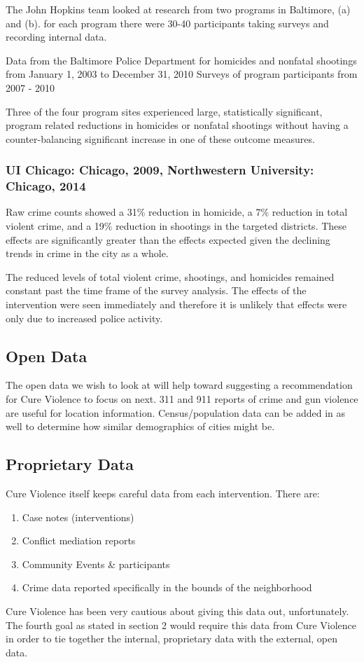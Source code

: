 \documentclass[11pt,preprint]{aastex}
\begin{document}
The John Hopkins team looked at research from two programs in Baltimore, (a) and (b). for each program there were 30-40 participants taking surveys and recording internal data. 

Data from the Baltimore Police Department for homicides and nonfatal shootings from January 1, 2003 to December 31, 2010
Surveys of program participants from 2007 - 2010


Three of the four program sites experienced large, statistically significant, program related reductions in homicides or nonfatal shootings without having a counter-balancing significant increase in one of these outcome measures.


\subsubsection*{UI Chicago: Chicago, 2009, Northwestern University: Chicago, 2014}

Raw crime counts showed a 31\% reduction in homicide, a 7\% reduction in total violent crime, and a 19\% reduction in shootings in the targeted districts. These effects are significantly greater than the effects expected given the declining trends in crime in the city as a whole.

The reduced levels of total violent crime, shootings, and homicides remained constant past the time frame of the survey analysis.  The effects of the intervention were seen immediately and therefore it is unlikely that effects were only due to increased police activity.

\subsection*{Open Data}
The open data we wish to look at will help toward suggesting a recommendation for Cure Violence to focus on next. 311 and 911 reports of crime and gun violence are useful for location information. Census/population data can be added in as well to determine how similar demographics of cities might be.


\subsection*{Proprietary Data}
Cure Violence itself keeps careful data from each intervention. There are:
\begin{enumerate}
\item Case notes (interventions)
\item Conflict mediation reports
\item Community Events \& participants
\item Crime data reported specifically in the bounds of the neighborhood
\end{enumerate}
Cure Violence has been very cautious about giving this data out, unfortunately. The fourth goal as stated in section 2 would require this data from Cure Violence in order to tie together the internal, proprietary data with the external, open data. 
\end{document}
